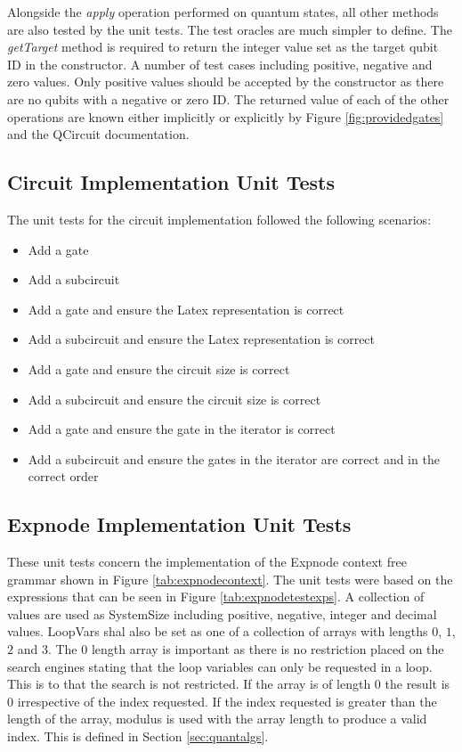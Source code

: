 Alongside the \emph{apply} operation performed on quantum states, all other methods are also tested by the unit tests.
The test oracles are much simpler to define.
The \emph{getTarget} method is required to return the integer value set as the target qubit ID in the constructor.
A number of test cases including positive, negative and zero values.
Only positive values should be accepted by the constructor as there are no qubits with a negative or zero ID.
The returned value of each of the other operations are known either implicitly or explicitly by Figure \ref{fig:providedgates} and the QCircuit\cite{QCsite} documentation.

\subsection{Circuit Implementation Unit Tests}
\label{sec:circtests}
The unit tests for the circuit implementation followed the following scenarios:
\begin{itemize}
 \item Add a gate
 \item Add a subcircuit
 \item Add a gate and ensure the Latex representation is correct
 \item Add a subcircuit and ensure the Latex representation is correct
 \item Add a gate and ensure the circuit size is correct
 \item Add a subcircuit and ensure the circuit size is correct
 \item Add a gate and ensure the gate in the iterator is correct
 \item Add a subcircuit and ensure the gates in the iterator are correct and in the correct order
\end{itemize}

\subsection{Expnode Implementation Unit Tests}
These unit tests concern the implementation of the Expnode context free grammar shown in Figure \ref{tab:expnodecontext}.
The unit tests were based on the expressions that can be seen in Figure \ref{tab:expnodetestexps}.
A collection of values are used as SystemSize including positive, negative, integer and decimal values.
LoopVars shal also be set as one of a collection of arrays with lengths $0$, $1$, $2$ and $3$.
The $0$ length array is important as there is no restriction placed on the search engines stating that the loop variables can only be requested in a loop.
This is to that the search is not restricted.
If the array is of length $0$ the result is $0$ irrespective of the index requested.
If the index requested is greater than the length of the array, modulus is used with the array length to produce a valid index.
This is defined in Section \ref{sec:quantalgs}.

